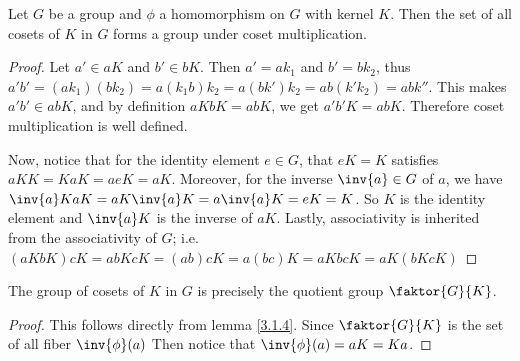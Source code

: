 \begin{theorem}\label{3.1.6}
    Let $G$ be a group and  $\phi$ a homomorphism on $G$ with kernel  $K$. Then
    the set of all cosets of  $K$ in  $G$ forms a group under coset
    multiplication.
\end{theorem}
\begin{proof}
    Let $a' \in aK$ and  $b' \in bK$. Then  $a'=ak_1$ and $b'=bk_2$, thus
    $a'b'=(ak_1)(bk_2)=a(k_1b)k_2=a(bk')k_2=ab(k'k_2)=abk''$. This makes $a'b'
    \in abK$, and by definition  $aKbK=abK$, we get  $a'b'K=abK$. Therefore
    coset multiplication is well defined.

    Now, notice that for the identity element  $e \in G$, that $eK=K$ satisfies
    $aKK=KaK=aeK=aK$. Moreover, for the inverse  $\inv{a} \in G$ of $a$, we have
     $\inv{a}KaK=aK\inv{a}K=a\inv{a}K=eK=K$. So $K$ is the identity element and
     $\inv{a}K$ is the inverse of  $aK$. Lastly, associativity is inherited from
     the associativity of $G$; i.e.
     $(aKbK)cK=abKcK=(ab)cK=a(bc)K=aKbcK=aK(bKcK)$
\end{proof}
\begin{corollary}
    The group of cosets of $K$ in  $G$ is precisely the quotient group
    $\faktor{G}{K}$.
\end{corollary}
\begin{proof}
    This follows directly from lemma \ref{3.1.4}. Since $\faktor{G}{K}$ is the
    set of all fiber $\inv{\phi}(a)$ Then notice that $\inv{\phi}(a)=aK=Ka$.
\end{proof}

